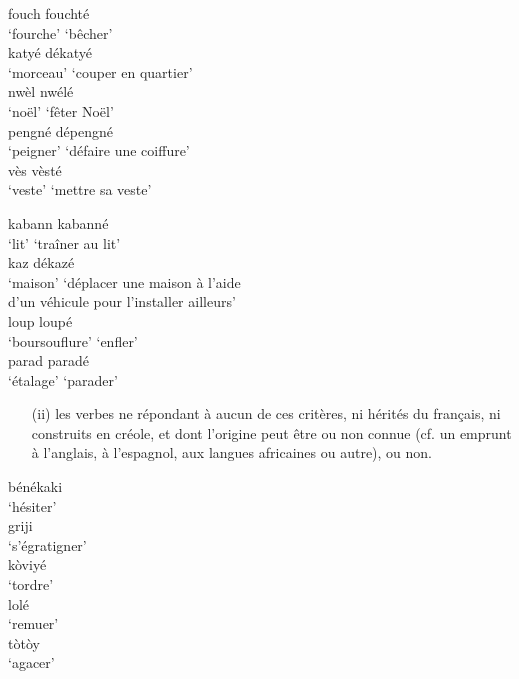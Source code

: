 \documentclass[output=paper]{langsci/langscibook}
\begin{document}
\ex\label{ex:VilloingDeglas:7}

  \ea \gll fouch \textrightarrow{} fouchté\\
  {`fourche'} {} {`bêcher'}\\
  \ex \gll katyé \textrightarrow{} dékatyé\\
  {`morceau'} {} {`couper en quartier'}\\
  \ex \gll nwèl \textrightarrow{} nwélé\\
  {`noël'} {} {`fêter Noël'}\\
  \ex \gll pengné \textrightarrow{} dépengné\\
  {`peigner'} {} {`défaire une coiffure'}\\
  \ex \gll vès \textrightarrow{} vèsté\\
  {`veste'} {} {`mettre sa veste'}\\
  \z

\ex\label{ex:VilloingDeglas:8}

  \ea \gll kabann \textrightarrow{} kabanné\\
  {`lit'} {} {`traîner au lit'}\\
  \ex \glll kaz \textrightarrow{} dékazé\\
  {`maison'} {} {`déplacer une maison à l'aide}\\
  {} {} {d'un véhicule pour l'installer ailleurs'}\\
  \ex \gll loup \textrightarrow{} loupé\\
  {`boursouflure'} {} {`enfler'}\\
  \ex \gll parad \textrightarrow{} paradé\\
  {`étalage'} {} {`parader'}\\
  \z
\z

\begin{enumerate}

\item[(ii)]
  les verbes ne répondant à aucun de ces critères, ni hérités du
  français, ni construits en créole, et dont l'origine peut être ou non
  connue (cf. un emprunt à l'anglais, à l'espagnol, aux langues
  africaines ou autre), ou non.
\end{enumerate}

\ea\label{ex:VilloingDeglas:9}

  \ea \gll bénékaki \\
  `hésiter'\\
  \ex \gll griji \\
  `s'égratigner'\\
  \ex \gll kòviyé \\
  `tordre'\\
  \ex \gll lolé \\
  `remuer'\\
  \ex \gll tòtòy \\
  `agacer'\\
\z\z
\end{document}
